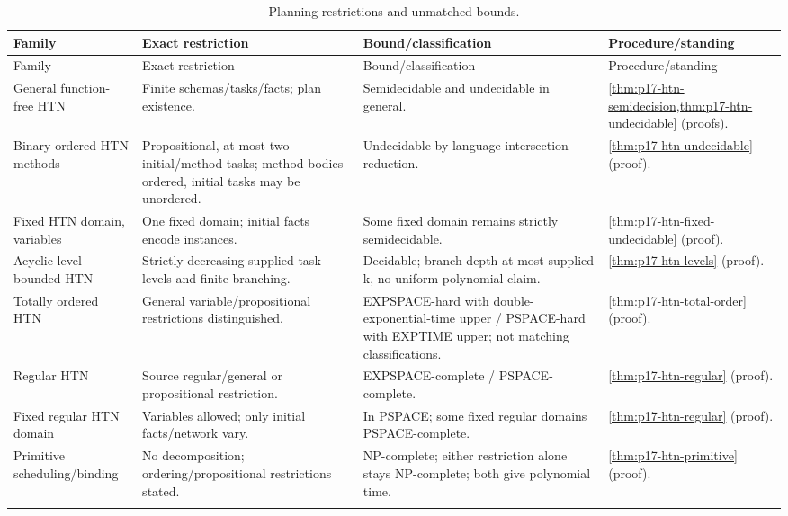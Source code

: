 \begin{landscape}
\begingroup\small\setlength{\tabcolsep}{3pt}
\begin{longtable}{@{}p{.18\linewidth}p{.25\linewidth}p{.23\linewidth}p{.26\linewidth}@{}}
\caption{Planning restrictions and unmatched bounds.}\label{tab:p14-dc-planning}\\
\toprule
Family & Exact restriction & Bound/classification & Procedure/standing\\\midrule
\endfirsthead
\toprule
Family & Exact restriction & Bound/classification & Procedure/standing\\\midrule
\endhead
\bottomrule\endfoot
General function-free HTN & Finite schemas/tasks/facts; plan existence. & Semidecidable and undecidable in general. & \cref{thm:p17-htn-semidecision,thm:p17-htn-undecidable} (proofs).\\\addlinespace
Binary ordered HTN methods & Propositional, at most two initial/method tasks; method bodies ordered, initial tasks may be unordered. & Undecidable by language intersection reduction. & \cref{thm:p17-htn-undecidable} (proof).\\\addlinespace
Fixed HTN domain, variables & One fixed domain; initial facts encode instances. & Some fixed domain remains strictly semidecidable. & \cref{thm:p17-htn-fixed-undecidable} (proof).\\\addlinespace
Acyclic level-bounded HTN & Strictly decreasing supplied task levels and finite branching. & Decidable; branch depth at most supplied k, no uniform polynomial claim. & \cref{thm:p17-htn-levels} (proof).\\\addlinespace
Totally ordered HTN & General variable/propositional restrictions distinguished. & EXPSPACE-hard with double-exponential-time upper / PSPACE-hard with EXPTIME upper; not matching classifications. & \cref{thm:p17-htn-total-order} (proof).\\\addlinespace
Regular HTN & Source regular/general or propositional restriction. & EXPSPACE-complete / PSPACE-complete. & \cref{thm:p17-htn-regular} (proof).\\\addlinespace
Fixed regular HTN domain & Variables allowed; only initial facts/network vary. & In PSPACE; some fixed regular domains PSPACE-complete. & \cref{thm:p17-htn-regular} (proof).\\\addlinespace
Primitive scheduling/binding & No decomposition; ordering/propositional restrictions stated. & NP-complete; either restriction alone stays NP-complete; both give polynomial time. & \cref{thm:p17-htn-primitive} (proof).\\\addlinespace
\end{longtable}
\endgroup
\end{landscape}

